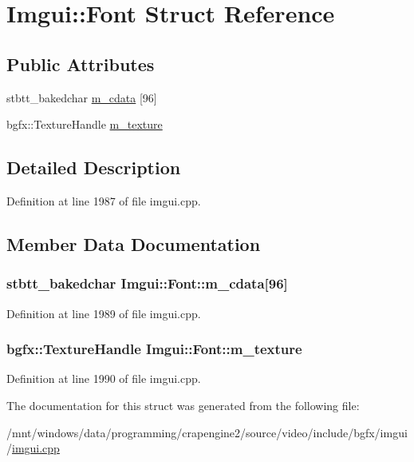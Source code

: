\hypertarget{struct_imgui_1_1_font}{\section{Imgui\+:\+:Font Struct Reference}
\label{struct_imgui_1_1_font}
}
\subsection*{Public Attributes}
\begin{DoxyCompactItemize}
\item 
stbtt\+\_\+bakedchar \hyperlink{struct_imgui_1_1_font_a764da428a5cb2aba27e7b62bca5499eb}{m\+\_\+cdata} \mbox{[}96\mbox{]}
\item 
bgfx\+::\+Texture\+Handle \hyperlink{struct_imgui_1_1_font_a9c46c6079b9024e17afd8da6d13ee428}{m\+\_\+texture}
\end{DoxyCompactItemize}


\subsection{Detailed Description}


Definition at line 1987 of file imgui.\+cpp.



\subsection{Member Data Documentation}
\hypertarget{struct_imgui_1_1_font_a764da428a5cb2aba27e7b62bca5499eb}{
\subsubsection[{m\+\_\+cdata}]{\setlength{\rightskip}{0pt plus 5cm}stbtt\+\_\+bakedchar Imgui\+::\+Font\+::m\+\_\+cdata\mbox{[}96\mbox{]}}}\label{struct_imgui_1_1_font_a764da428a5cb2aba27e7b62bca5499eb}


Definition at line 1989 of file imgui.\+cpp.

\hypertarget{struct_imgui_1_1_font_a9c46c6079b9024e17afd8da6d13ee428}{
\subsubsection[{m\+\_\+texture}]{\setlength{\rightskip}{0pt plus 5cm}bgfx\+::\+Texture\+Handle Imgui\+::\+Font\+::m\+\_\+texture}}\label{struct_imgui_1_1_font_a9c46c6079b9024e17afd8da6d13ee428}


Definition at line 1990 of file imgui.\+cpp.



The documentation for this struct was generated from the following file\+:\begin{DoxyCompactItemize}
\item 
/mnt/windows/data/programming/crapengine2/source/video/include/bgfx/imgui/\hyperlink{imgui_8cpp}{imgui.\+cpp}\end{DoxyCompactItemize}

